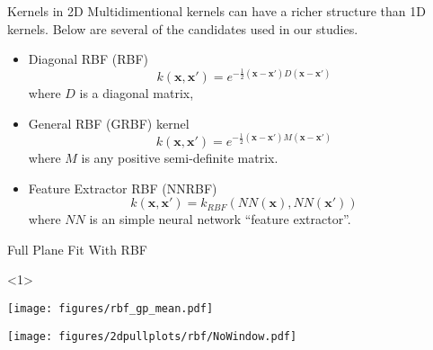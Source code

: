 \documentclass[10pt]{beamer}
\begin{document}
\begin{frame}{Kernels in 2D}
  Multidimentional kernels can have a richer structure than 1D kernels. Below are several of the candidates used in our studies.
  \begin{itemize}
  \item Diagonal RBF (RBF)
    \begin{equation}
      k(\bm{x},\bm{x'}) = e^{ -\frac{1}{2} \left(  \bm{x} - \bm{x'}\right) D \left(  \bm{x} - \bm{x'}\right)}
    \end{equation}
    where $D$ is a diagonal matrix,
  \item General RBF (GRBF) kernel
    \begin{equation}
      k(\bm{x},\bm{x'}) = e^{ -\frac{1}{2} \left(  \bm{x} - \bm{x'}\right) M \left(  \bm{x} - \bm{x'}\right)}
    \end{equation}
    where $M$ is any positive semi-definite matrix.
  \item Feature Extractor RBF (NNRBF)
    \begin{equation}
      k(\bm{x},\bm{x'}) =  k_{RBF}(NN(\bm{x}),NN(\bm{x'}))
    \end{equation}
    where $NN$ is an simple neural network ``feature extractor''.
  \end{itemize}
\end{frame}


\begin{frame}{Full Plane Fit With RBF}
  \begin{center}
    \begin{onlyenv}<1>
      \begin{annotimage}{\texttt{[image: figures/rbf\_gp\_mean.pdf]}}
      \end{annotimage}
      \begin{annotimage}{\texttt{[image: figures/2dpullplots/rbf/NoWindow.pdf]}}
      \end{annotimage}
    \end{onlyenv}
  \end{center}
\end{frame}


\newcommand{\makegrid}[6]{
  \begin{center}
    \blockcite[(0,1em)]{#1}{$m_{\stopq}=1200\,,\,m_{\chi}=600$}
    \blockcite[(0,1em)]{#2}{$m_{\stopq}=1500\,,\,m_{\chi}=750$}
    \blockcite[(0,1em)]{#3}{$m_{\stopq}=1500\,,\,m_{\chi}=750$}
  \end{center}
  \begin{center}
    \blockcite[(0,1em)]{#4}{$m_{\stopq}=1500\,,\,m_{\chi}=750$}
    \blockcite[(0,1em)]{#5}{$m_{\stopq}=2000\,,\,m_{\chi}=1400$}
    \blockcite[(0,1em)]{#6}{$m_{\stopq}=2000\,,\,m_{\chi}=1000$}
  \end{center}

}
\end{document}
